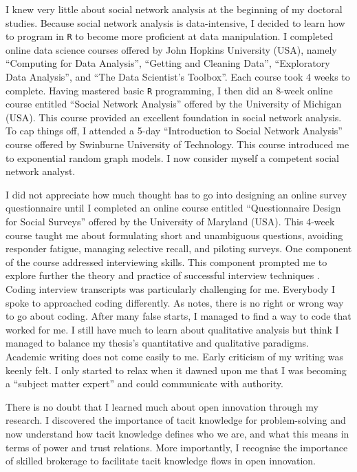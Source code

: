 \documentclass[12pt,table]{book}
\begin{document}
I knew very little about social network analysis at the beginning of my doctoral studies. Because social network analysis is data-intensive, I decided to learn how to program in \texttt{R} to become more proficient at data manipulation. I completed online data science courses offered by John Hopkins University (USA), namely \enquote{Computing for Data Analysis}, \enquote{Getting and Cleaning Data}, \enquote{Exploratory Data Analysis}, and \enquote{The Data Scientist's Toolbox}. Each course took 4 weeks to complete. Having mastered basic \texttt{R} programming, I then did an 8-week online course entitled \enquote{Social Network Analysis} offered by the University of Michigan (USA). This course provided an excellent foundation in social network analysis. To cap things off, I attended a 5-day \enquote{Introduction to Social Network Analysis} course offered by Swinburne University of Technology. This course introduced me to exponential random graph models. I now consider myself a competent social network analyst. \medskip

I did not appreciate how much thought has to go into designing an online survey questionnaire until I completed an online course entitled \enquote{Questionnaire Design for Social Surveys} offered by the University of Maryland (USA). This 4-week course taught me about formulating short and unambiguous questions, avoiding responder fatigue, managing selective recall, and piloting surveys. One component of the course addressed interviewing skills. This component prompted me to explore further the theory and practice of successful interview techniques \citep[e.g.][]{kvale2008doing,seidman2012interviewing}. Coding interview transcripts was particularly challenging for me. Everybody I spoke to approached coding differently. As \citet{saldana2015coding} notes, there is no right or wrong way to go about coding. After many false starts, I managed to find a way to code that worked for me. I still have much to learn about qualitative analysis but think I managed to balance my thesis's quantitative and qualitative paradigms. Academic writing does not come easily to me. Early criticism of my writing was keenly felt. I only started to relax when it dawned upon me that I was becoming a \enquote{subject matter expert} and could communicate with authority. \medskip

There is no doubt that I learned much about open innovation through my research. I discovered the importance of tacit knowledge for problem-solving and now understand how tacit knowledge defines who we are, and what this means in terms of power and trust relations. More importantly, I recognise the importance of skilled brokerage to facilitate tacit knowledge flows in open innovation. 
\end{document}
